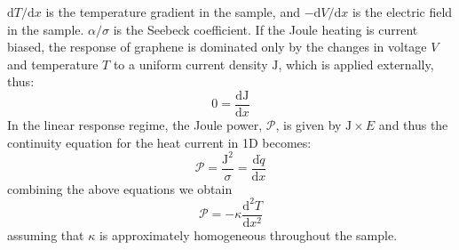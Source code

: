 $\mathrm{d}T/\mathrm{d}x$ is the temperature gradient in the sample,  and $-\mathrm{d}V/\mathrm{d}x$ is the electric field in the sample.  $\alpha/\sigma$ is the Seebeck coefficient.  If the Joule heating is current biased, the response of graphene is dominated only by the changes in voltage $V$ and temperature $T$ to a uniform current density $\mathrm{J}$, which is applied externally, thus:
\begin{equation}\label{eq:1Dconduction_contJ}
0 = \frac{\mathrm{d}\mathrm{J}}{\mathrm{d}x}
\end{equation}
In the linear response regime, the Joule power, $\mathcal{P}$, is given by $\mathrm{J}\times E$ and thus the continuity equation for the heat current in 1D becomes:
\begin{equation}\label{eq:1Dconduction_contq}
\mathcal{P} = \frac{\mathrm{J}^2}{\sigma} =  \frac{\mathrm{d}\dot{q}}{\mathrm{d}x}
\end{equation}\label{eq:1Dconduction_diffeq}
combining the above equations we obtain \begin{equation}
\mathcal{P} = -\kappa \frac{\mathrm{d}^2 T}{\mathrm{d}x^2}
\end{equation}
assuming that $\kappa$ is approximately homogeneous throughout the sample.

